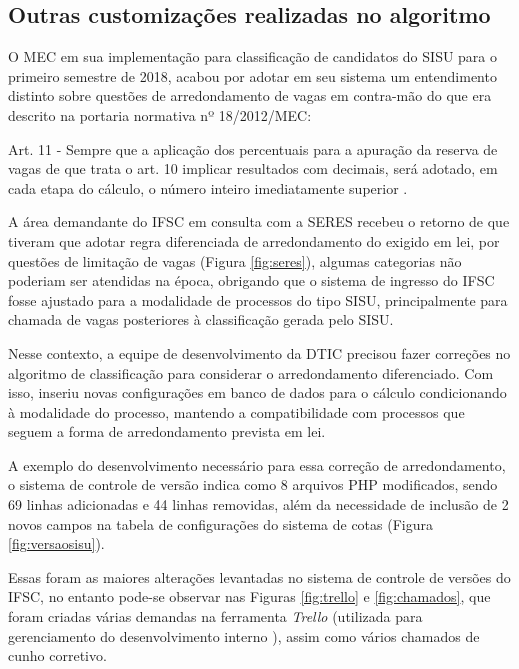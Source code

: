 \subsection{Outras customizações realizadas no algoritmo}
\label{outrasVersoes}

O \gls{MEC} em sua implementação para classificação de candidatos do \gls{SISU} para o primeiro semestre de 2018, acabou por adotar em seu sistema um entendimento distinto sobre questões de arredondamento de vagas em contra-mão do que era descrito na portaria normativa nº 18/2012/MEC:

\begin{citacao}
Art. 11 - Sempre que a aplicação dos percentuais para a apuração da reserva de vagas de que trata o art. 10 implicar resultados com decimais, será adotado, em cada etapa do cálculo, o número inteiro imediatamente superior \cite{portarianr9}.
\end{citacao}



A área demandante do \gls{IFSC} em consulta com a \gls{SERES} recebeu o retorno de que tiveram que adotar regra diferenciada de arredondamento do exigido em lei, por questões de limitação de vagas (Figura \ref{fig:seres}), algumas categorias não poderiam ser atendidas na época, obrigando que o sistema de ingresso do \gls{IFSC} fosse ajustado para a modalidade de processos do tipo \gls{SISU}, principalmente para chamada de vagas posteriores à classificação gerada pelo \gls{SISU}.

Nesse contexto, a equipe de desenvolvimento da \gls{DTIC} precisou fazer correções no algoritmo de classificação para considerar o arredondamento diferenciado. Com isso, inseriu novas configurações em banco de dados para o cálculo condicionando à modalidade do processo, mantendo a compatibilidade com processos que seguem a forma de arredondamento prevista em lei.

A exemplo do desenvolvimento necessário para essa correção de arredondamento, o sistema de controle de versão indica como 8 arquivos PHP modificados, sendo 69 linhas adicionadas e 44 linhas removidas, além da necessidade de inclusão de 2 novos campos na tabela de configurações do sistema de cotas (Figura \ref{fig:versaosisu}).




Essas foram as maiores alterações levantadas no sistema de controle de versões do \gls{IFSC}, no entanto pode-se observar nas Figuras \ref{fig:trello} e \ref{fig:chamados}, que foram criadas várias demandas na ferramenta \textit{Trello} (utilizada para gerenciamento do desenvolvimento interno ), assim como vários chamados de cunho corretivo.  
\newpage



